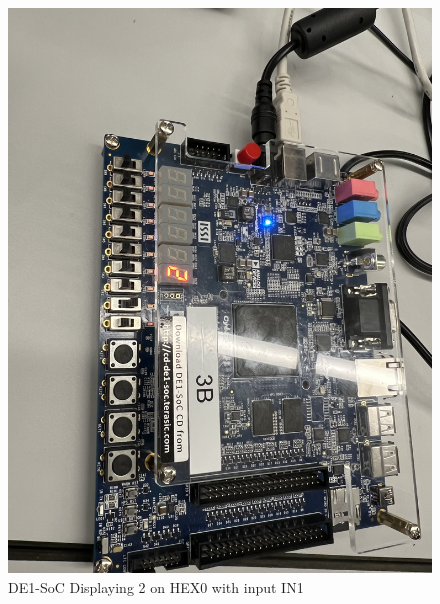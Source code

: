 \documentclass[
	letterpaper, %
	10pt, %
]{CSUniSchoolLabReport}
\begin{document}
\begin{figure}[H]
  \centering
  \includegraphics[width=.9\textwidth]{Figures/Disp_2.jpg}
  \caption{DE1-SoC Displaying 2 on HEX0 with input IN1}
  \label{fig:5}
\end{figure}
\end{document}
